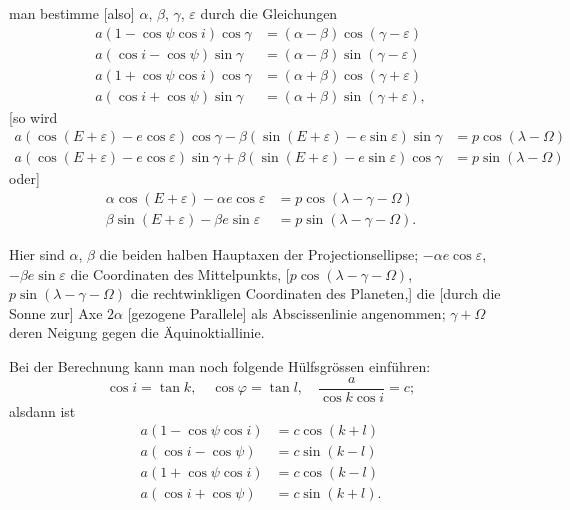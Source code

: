 \documentclass[12pt,a4paper]{article}
\begin{document}
\newpage

\noindent
man bestimme [also] $\alpha$, $\beta$, $\gamma$, $\varepsilon$ durch die Gleichungen
\begin{align*}
a(1 - \cos\psi\cos i)\cos\gamma &= (\alpha - \beta)\cos(\gamma - \varepsilon) \\
a(\cos i - \cos\psi)\sin\gamma &= (\alpha - \beta)\sin(\gamma - \varepsilon) \\
a(1 + \cos\psi\cos i)\cos\gamma &= (\alpha + \beta)\cos(\gamma + \varepsilon) \\
a(\cos i + \cos\psi)\sin\gamma &= (\alpha + \beta)\sin(\gamma + \varepsilon),
\end{align*}
[so wird
\begin{align*}
a(\cos(E + \varepsilon) - e\cos\varepsilon)\cos\gamma - \beta(\sin(E + \varepsilon) - e\sin\varepsilon)\sin\gamma &= p\cos(\lambda - \Omega) \\
a(\cos(E + \varepsilon) - e\cos\varepsilon)\sin\gamma + \beta(\sin(E + \varepsilon) - e\sin\varepsilon)\cos\gamma &= p\sin(\lambda - \Omega)
\end{align*}
oder]
\begin{align*}
\alpha\cos(E + \varepsilon) - \alpha e\cos\varepsilon &= p\cos(\lambda - \gamma - \Omega) \\
\beta\sin(E + \varepsilon) - \beta e\sin\varepsilon &= p\sin(\lambda - \gamma - \Omega).
\end{align*}

Hier sind $\alpha$, $\beta$ die beiden halben Hauptaxen der Projectionsellipse;
$-\alpha e\cos\varepsilon$, $-\beta e\sin\varepsilon$ die Coordinaten des Mittelpunkts, [$p\cos(\lambda - \gamma - \Omega)$,
$p\sin(\lambda - \gamma - \Omega)$ die rechtwinkligen Coordinaten des Planeten,] die [durch die
Sonne zur] Axe $2\alpha$ [gezogene Parallele] als Abscissenlinie angenommen; $\gamma + \Omega$
deren Neigung gegen die \"Aquinoktiallinie.

\medskip
\noindent
Bei der Berechnung kann man noch folgende H\"ulfsgr\"ossen einf\"uhren:
\[
\cos i = \tan k, \quad \cos\varphi = \tan l, \quad \frac{a}{\cos k \cos i} = c;
\]
alsdann ist
\begin{align*}
a(1 - \cos\psi\cos i) &= c\cos(k + l) \\
a(\cos i - \cos\psi) &= c\sin(k - l) \\
a(1 + \cos\psi\cos i) &= c\cos(k - l) \\
a(\cos i + \cos\psi) &= c\sin(k + l).
\end{align*}
\end{document}
